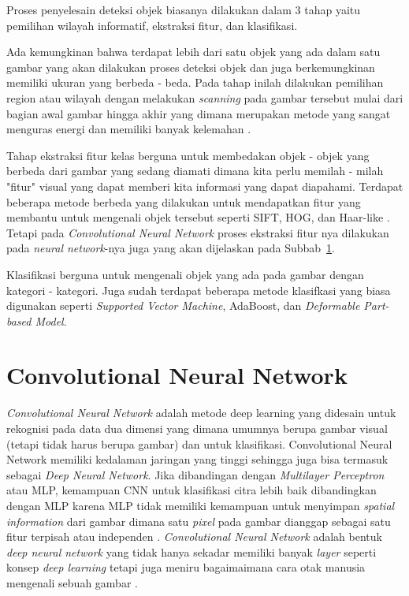 \par Proses penyelesain deteksi objek biasanya dilakukan dalam 3 tahap yaitu pemilihan wilayah informatif, ekstraksi fitur, dan
klasifikasi.

\par Ada kemungkinan bahwa terdapat lebih dari satu objek yang ada dalam satu gambar yang akan dilakukan proses deteksi objek dan
juga berkemungkinan memiliki ukuran yang berbeda - beda. Pada tahap inilah dilakukan pemilihan region atau wilayah dengan melakukan \emph{scanning} pada gambar tersebut mulai
dari bagian awal gambar hingga akhir yang dimana merupakan metode yang sangat menguras energi dan memiliki banyak kelemahan \cite{zhao2019object}.

\par Tahap ekstraksi fitur kelas berguna untuk membedakan objek - objek yang berbeda dari gambar yang sedang diamati dimana kita perlu
memilah - milah "fitur" visual yang dapat memberi kita informasi yang dapat diapahami. Terdapat beberapa metode berbeda yang dilakukan
untuk mendapatkan fitur yang membantu untuk mengenali objek tersebut seperti SIFT, HOG, dan Haar-like \cite{zhao2019object}. Tetapi pada \emph{Convolutional Neural Network}
proses ekstraksi fitur nya dilakukan pada \emph{neural network}-nya juga yang akan dijelaskan pada Subbab~\ref{sec:convolutionalneuralnetwork}.

\par Klasifikasi berguna untuk mengenali objek yang ada pada gambar dengan kategori - kategori. Juga sudah terdapat beberapa metode
klasifkasi yang biasa digunakan seperti \emph{Supported Vector Machine}, AdaBoost, dan \emph{Deformable Part-based Model}. 


\section{Convolutional Neural Network}
\label{sec:convolutionalneuralnetwork}

\par \emph{Convolutional Neural Network} adalah metode deep learning yang didesain untuk rekognisi pada data dua 
dimensi yang dimana umumnya berupa gambar visual (tetapi tidak harus berupa gambar) dan untuk klasifikasi.
Convolutional Neural Network memiliki kedalaman jaringan yang tinggi sehingga juga bisa termasuk sebagai \emph{Deep Neural Network}.
Jika dibandingan dengan \emph{Multilayer Perceptron} atau MLP, kemampuan CNN untuk klasifikasi citra lebih baik dibandingkan dengan MLP karena MLP tidak memiliki
kemampuan untuk menyimpan \emph{spatial information} dari gambar dimana satu \emph{pixel} pada gambar dianggap sebagai satu fitur
terpisah atau independen \cite{putra2016klasifikasi}. \emph{Convolutional Neural Network} adalah bentuk \emph{deep neural network} yang tidak hanya
sekadar memiliki banyak \emph{layer} seperti konsep \emph{deep learning} tetapi juga meniru bagaimaimana cara otak manusia mengenali sebuah gambar \cite{kim2017convolutional}.

